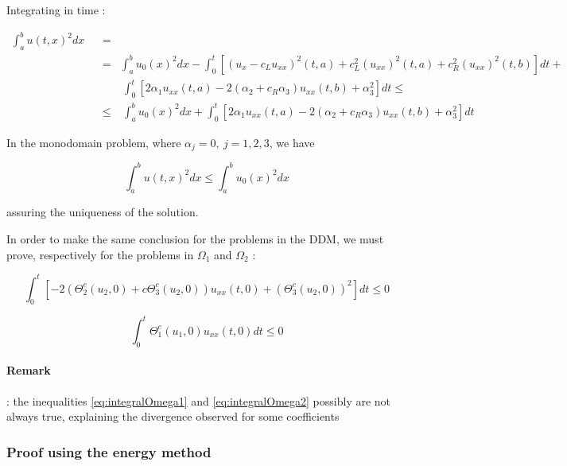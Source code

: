 \indent Integrating in time :

\begin{equation}
\label{eq:uniq3}
\begin{aligned}
	 \int_a^b{u(t,x)^2 dx} && = & \\
	 									&&  = & \int_a^b{u_0(x)^2 dx}  - \int_0^t{ \left[ \left(u_x - c_Lu_{xx}\right)^2(t,a) + c_L^2 (u_{xx})^2(t,a) + c_R^2 (u_{xx})^2(t,b) \right]dt} + \\
	 																			&&    & \ \int_0^t{ \left[ 2\alpha_1 u_{xx}(t,a) - 2(\alpha_2 + c_R\alpha_3)u_{xx}(t,b) + \alpha_3^2 \right] dt} \leq \\
	 									&& \leq & \  \int_a^b{u_0(x)^2 dx} + \int_0^t{ \left[ 2\alpha_1 u_{xx}(t,a) - 2(\alpha_2 + c_R\alpha_3)u_{xx}(t,b) + \alpha_3^2 \right] dt}
\end{aligned}
\end{equation}

\indent In the monodomain problem, where $\alpha_j = 0, \ j=1,2,3$, we have 

\begin{equation*}
	 \int_a^b{u(t,x)^2 dx} \leq \int_a^b{u_0(x)^2 dx}
\end{equation*}

\noindent assuring the uniqueness of the solution.

\indent In order to make the same conclusion for the problems in the DDM, we must prove, respectively for the problems in $\Omega_1$ and $\Omega_2$ :

\begin{equation}
	\label{eq:integralOmega1}
	\int_0^t{ \left[ - 2(\Theta_2^{c}(u_2,0)  + c\Theta_3^{c}(u_2,0))u_{xx}(t,0) + (\Theta_3^{c}(u_2,0))^2 \right] dt} \leq 0
\end{equation}

\begin{equation}
	\label{eq:integralOmega2}
	\int_0^t{ \Theta_1^{c}(u_1,0)  u_{xx}(t,0) dt} \leq 0
\end{equation}

\paragraph{Remark} : the inequalities \eqref{eq:integralOmega1} and \eqref{eq:integralOmega2} possibly are not always true, explaining the divergence observed for some coefficients 



\subsubsection{Proof using the energy method}

